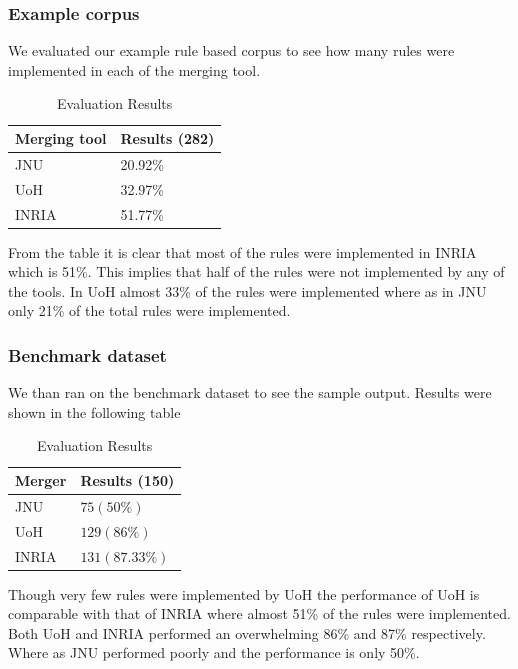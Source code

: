 \documentclass[11pt]{article}
\begin{document}
\subsubsection{Example corpus}
We evaluated our example rule based corpus to see how many rules were implemented in each of the merging tool.
\begin{table}[h]
	\begin{center}
		\begin{tabular}{|l|l|}
			\hline \bf Merging tool & \bf Results (282) \\ \hline
			JNU&20.92\% \\ \hline
			UoH&32.97\% \\ \hline
			INRIA&51.77\% \\ \hline
		\end{tabular}
	\end{center}
	\caption{\label{font-table} Evaluation Results }
\end{table}

From the table it is clear that most of the rules were implemented in INRIA which is 51\%.  This implies that half of the rules were not implemented by any of the tools. In UoH almost 33\% of the rules were implemented where as in JNU only 21\% of the total rules were implemented.
\subsubsection{Benchmark dataset}

We than ran on the benchmark dataset to see the sample output. Results were shown in the following table

\begin{table}[h]
	\begin{center}
		\begin{tabular}{|l  | l |}
			\hline \bf  Merger & \bf Results (150) \\
			\hline
			JNU &  $75 (50\%)$\\ \hline
			UoH &  $129 (86\%)$\\ \hline
			INRIA & $131 (87.33\%)$\\ \hline
		\end{tabular}
	\end{center}
	\caption{\label{font-table} Evaluation Results }
\end{table}

Though very few rules were implemented by UoH the performance of UoH is comparable with that of INRIA where almost 51\% of the rules were implemented. Both UoH and INRIA performed an overwhelming 86\% and 87\% respectively. Where as JNU performed poorly and the performance is only 50\%.
\end{document}
